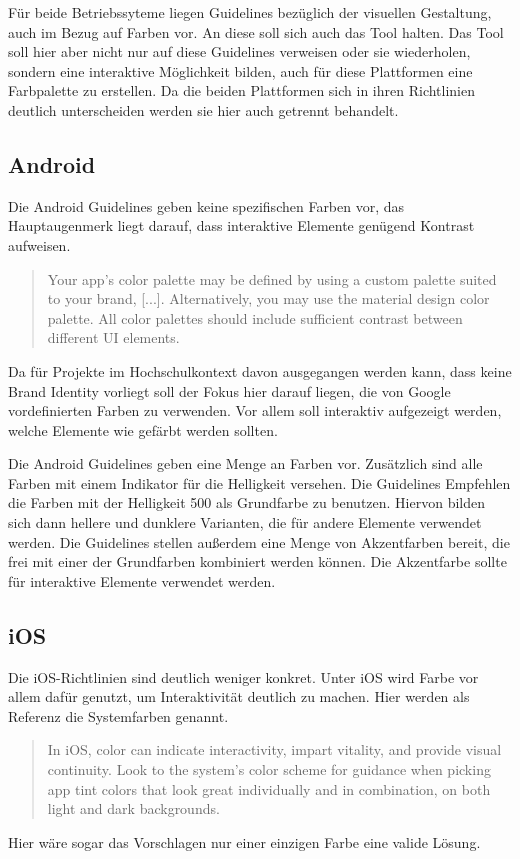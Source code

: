 Für beide Betriebssyteme liegen Guidelines bezüglich der visuellen Gestaltung, auch im Bezug auf Farben vor. An diese soll sich auch das Tool halten. Das Tool soll hier aber nicht nur auf diese Guidelines verweisen oder sie wiederholen, sondern eine interaktive Möglichkeit bilden, auch für diese Plattformen eine Farbpalette zu erstellen.
Da die beiden Plattformen sich in ihren Richtlinien deutlich unterscheiden werden sie hier auch getrennt behandelt.

\subsection{Android}
Die Android Guidelines geben keine spezifischen Farben vor, das Hauptaugenmerk liegt darauf, dass interaktive Elemente genügend Kontrast aufweisen.

\begin{quote}
Your app's color palette may be defined by using a custom palette suited to your brand, [...]. Alternatively, you may use the material design color palette. All color palettes should include sufficient contrast between different UI elements.
\end{quote}

Da für Projekte im Hochschulkontext davon ausgegangen werden kann, dass keine Brand Identity vorliegt soll der Fokus hier darauf liegen, die von Google vordefinierten Farben zu verwenden. Vor allem soll interaktiv aufgezeigt werden, welche Elemente wie gefärbt werden sollten.

Die Android Guidelines geben eine Menge an Farben vor. Zusätzlich sind alle Farben mit einem Indikator für die Helligkeit versehen. Die Guidelines Empfehlen die Farben mit der Helligkeit 500 als Grundfarbe zu benutzen. Hiervon bilden sich dann hellere und dunklere Varianten, die für andere Elemente verwendet werden.
Die Guidelines stellen außerdem eine Menge von Akzentfarben bereit, die frei mit einer der Grundfarben kombiniert werden können. Die Akzentfarbe sollte für interaktive Elemente verwendet werden.

\subsection{iOS}

Die iOS-Richtlinien sind deutlich weniger konkret. Unter iOS wird Farbe vor allem dafür genutzt, um Interaktivität deutlich zu machen. Hier werden als Referenz die Systemfarben genannt.

\begin{quote}
In iOS, color can indicate interactivity, impart vitality, and provide visual continuity. Look to the system’s color scheme for guidance when picking app tint colors that look great individually and in combination, on both light and dark backgrounds.
\end{quote}

Hier wäre sogar das Vorschlagen nur einer einzigen Farbe eine valide Lösung.


